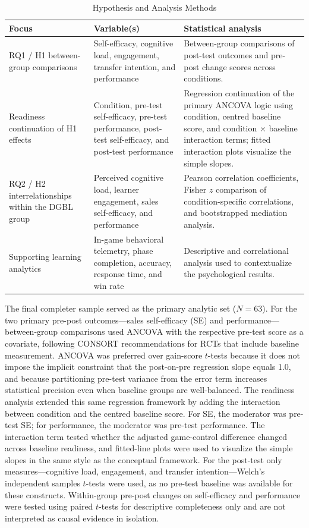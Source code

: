 \documentclass[12pt]{report}
\begin{document}
\begin{table}[htbp]
\centering
\caption{Hypothesis and Analysis Methods}
\begin{tabularx}{\textwidth}{L{3.3cm}L{3.5cm}Y}
\toprule
\textbf{Focus} & \textbf{Variable(s)} & \textbf{Statistical analysis} \\
\midrule
RQ1 / H1 between-group comparisons & Self-efficacy, cognitive load, engagement, transfer intention, and performance & Between-group comparisons of post-test outcomes and pre-post change scores across conditions. \\
Readiness continuation of H1 effects & Condition, pre-test self-efficacy, pre-test performance, post-test self-efficacy, and post-test performance & Regression continuation of the primary ANCOVA logic using condition, centred baseline score, and condition $\times$ baseline interaction terms; fitted interaction plots visualize the simple slopes. \\
RQ2 / H2 interrelationships within the DGBL group & Perceived cognitive load, learner engagement, sales self-efficacy, and performance & Pearson correlation coefficients, Fisher $z$ comparison of condition-specific correlations, and bootstrapped mediation analysis. \\
Supporting learning analytics & In-game behavioral telemetry, phase completion, accuracy, response time, and win rate & Descriptive and correlational analysis used to contextualize the psychological results. \\
\bottomrule
\end{tabularx}
\end{table}

The final completer sample served as the primary analytic set ($N = 63$). For the two primary pre-post outcomes---sales self-efficacy (SE) and performance---between-group comparisons used ANCOVA with the respective pre-test score as a covariate, following CONSORT recommendations for RCTs that include baseline measurement. ANCOVA was preferred over gain-score $t$-tests because it does not impose the implicit constraint that the post-on-pre regression slope equals 1.0, and because partitioning pre-test variance from the error term increases statistical precision even when baseline groups are well-balanced. The readiness analysis extended this same regression framework by adding the interaction between condition and the centred baseline score. For SE, the moderator was pre-test SE; for performance, the moderator was pre-test performance. The interaction term tested whether the adjusted game-control difference changed across baseline readiness, and fitted-line plots were used to visualize the simple slopes in the same style as the conceptual framework. For the post-test only measures---cognitive load, engagement, and transfer intention---Welch's independent samples $t$-tests were used, as no pre-test baseline was available for these constructs. Within-group pre-post changes on self-efficacy and performance were tested using paired $t$-tests for descriptive completeness only and are not interpreted as causal evidence in isolation.
\end{document}
